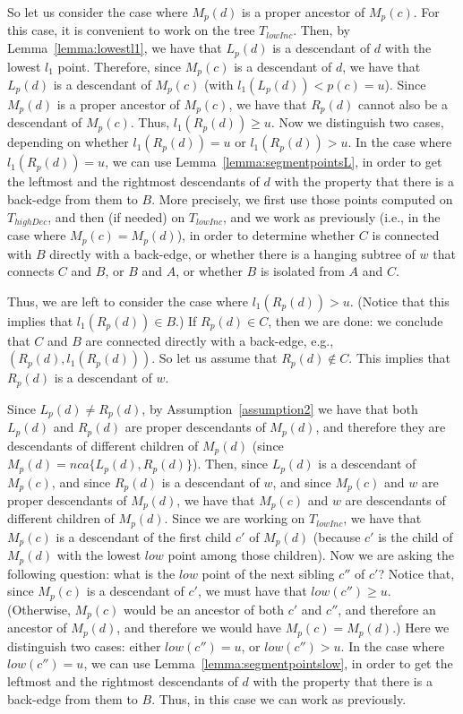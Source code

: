 \documentclass[11pt,a4paper]{article}
\begin{document}
So let us consider the case where $M_p(d)$ is a proper ancestor of $M_p(c)$. For this case, it is convenient to work on the tree $T_\mathit{lowInc}$. Then, by Lemma~\ref{lemma:lowestl1}, we have that $L_p(d)$ is a descendant of $d$ with the lowest $l_1$ point. Therefore, since $M_p(c)$ is a descendant of $d$, we have that $L_p(d)$ is a descendant of $M_p(c)$ (with $l_1(L_p(d))<p(c)=u$). Since $M_p(d)$ is a proper ancestor of $M_p(c)$, we have that $R_p(d)$ cannot also be a descendant of $M_p(c)$. Thus, $l_1(R_p(d))\geq u$. Now we distinguish two cases, depending on whether $l_1(R_p(d))=u$ or $l_1(R_p(d))>u$. In the case where $l_1(R_p(d))=u$, we can use Lemma~\ref{lemma:segmentpointsL}, in order to get the leftmost and the rightmost descendants of $d$ with the property that there is a back-edge from them to $B$. More precisely, we first use those points computed on $T_\mathit{highDec}$, and then (if needed) on $T_\mathit{lowInc}$, and we work as previously (i.e., in the case where $M_p(c)=M_p(d)$), in order to determine whether $C$ is connected with $B$ directly with a back-edge, or whether there is a  hanging subtree of $w$ that connects $C$ and $B$, or $B$ and $A$, or whether $B$ is isolated from $A$ and $C$.  



Thus, we are left to consider the case where $l_1(R_p(d))>u$. (Notice that this implies that $l_1(R_p(d))\in B$.) If $R_p(d)\in C$, then we are done: we conclude that $C$ and $B$ are connected directly with a back-edge, e.g., $(R_p(d),l_1(R_p(d)))$. So let us assume that $R_p(d)\notin C$. This implies that $R_p(d)$ is a descendant of $w$.

Since $L_p(d)\neq R_p(d)$, by Assumption~\ref{assumption2} we have that both $L_p(d)$ and $R_p(d)$ are proper descendants of $M_p(d)$, and therefore they are descendants of different children of $M_p(d)$ (since $M_p(d)=\mathit{nca}\{L_p(d),R_p(d)\}$). Then, since $L_p(d)$ is a descendant of $M_p(c)$, and since $R_p(d)$ is a descendant of $w$, and since $M_p(c)$ and $w$ are proper descendants of $M_p(d)$, we have that $M_p(c)$ and $w$ are descendants of different children of $M_p(d)$. 
Since we are working on $T_\mathit{lowInc}$, we have that $M_p(c)$ is a descendant of the first child $c'$ of $M_p(d)$ (because $c'$ is the child of $M_p(d)$ with the lowest $\mathit{low}$ point among those children). Now we are asking the following question: what is the $\mathit{low}$ point of the next sibling $c''$ of $c'$? Notice that, since $M_p(c)$ is a descendant of $c'$, we must have that $\mathit{low}(c'')\geq u$. (Otherwise, $M_p(c)$ would be an ancestor of both $c'$ and $c''$, and therefore an ancestor of $M_p(d)$, and therefore we would have $M_p(c)=M_p(d)$.) Here we distinguish two cases: either $\mathit{low}(c'')=u$, or $\mathit{low}(c'')>u$. In the case where $\mathit{low}(c'')=u$, we can use Lemma~\ref{lemma:segmentpointslow}, in order to get the leftmost and the rightmost descendants of $d$ with the property that there is a back-edge from them to $B$. Thus, in this case we can work as previously.
\end{document}
